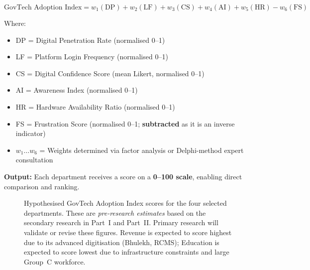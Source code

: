 \documentclass[12pt,a4paper]{article}
\begin{document}
\begin{sourcebox}
\begin{equation*}
\text{GovTech Adoption Index} = w_1(\text{DP}) + w_2(\text{LF}) + w_3(\text{CS}) + w_4(\text{AI}) + w_5(\text{HR}) - w_6(\text{FS})
\end{equation*}

\noindent Where:
\begin{itemize}[leftmargin=1cm, itemsep=2pt]
  \item DP = Digital Penetration Rate (normalised 0--1)
  \item LF = Platform Login Frequency (normalised 0--1)
  \item CS = Digital Confidence Score (mean Likert, normalised 0--1)
  \item AI = Awareness Index (normalised 0--1)
  \item HR = Hardware Availability Ratio (normalised 0--1)
  \item FS = Frustration Score (normalised 0--1; \textbf{subtracted} as it is an inverse indicator)
  \item $w_1 \ldots w_6$ = Weights determined via factor analysis or Delphi-method expert consultation
\end{itemize}

\noindent\textbf{Output:} Each department receives a score on a \textbf{0--100 scale}, enabling direct comparison and ranking.
\end{sourcebox}

\begin{figure}[H]
\centering
{}
\caption{Hypothesised GovTech Adoption Index scores for the four selected departments. These are {\itshape pre-research estimates} based on the secondary research in Part~I and Part~II. Primary research will validate or revise these figures. Revenue is expected to score highest due to its advanced digitisation (Bhulekh, RCMS); Education is expected to score lowest due to infrastructure constraints and large Group~C workforce.}
\label{fig:hypothesised_index}
\end{figure}
\end{document}
